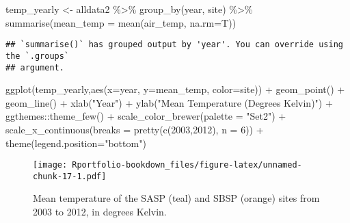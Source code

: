 \documentclass[
]{book}
\newenvironment{Shaded}{\begin{snugshade}}{\end{snugshade}}
\newcommand{\AttributeTok}[1]{\textcolor[rgb]{0.77,0.63,0.00}{#1}}
\newcommand{\DecValTok}[1]{\textcolor[rgb]{0.00,0.00,0.81}{#1}}
\newcommand{\FunctionTok}[1]{\textcolor[rgb]{0.00,0.00,0.00}{#1}}
\newcommand{\NormalTok}[1]{#1}
\newcommand{\OtherTok}[1]{\textcolor[rgb]{0.56,0.35,0.01}{#1}}
\newcommand{\SpecialCharTok}[1]{\textcolor[rgb]{0.00,0.00,0.00}{#1}}
\newcommand{\StringTok}[1]{\textcolor[rgb]{0.31,0.60,0.02}{#1}}
\begin{document}
\begin{Shaded}
\begin{Highlighting}[]
\NormalTok{temp\_yearly }\OtherTok{\textless{}{-}}\NormalTok{ alldata2 }\SpecialCharTok{\%\textgreater{}\%} 
\FunctionTok{group\_by}\NormalTok{(year, site) }\SpecialCharTok{\%\textgreater{}\%}
\FunctionTok{summarise}\NormalTok{(}\AttributeTok{mean\_temp =} \FunctionTok{mean}\NormalTok{(}\StringTok{\textasciigrave{}}\AttributeTok{air\_temp}\StringTok{\textasciigrave{}}\NormalTok{, }\AttributeTok{na.rm=}\NormalTok{T))}
\end{Highlighting}
\end{Shaded}

\begin{verbatim}
## `summarise()` has grouped output by 'year'. You can override using the `.groups`
## argument.
\end{verbatim}

\begin{Shaded}
\begin{Highlighting}[]
\FunctionTok{ggplot}\NormalTok{(temp\_yearly,}\FunctionTok{aes}\NormalTok{(}\AttributeTok{x=}\NormalTok{year, }\AttributeTok{y=}\NormalTok{mean\_temp, }\AttributeTok{color=}\NormalTok{site)) }\SpecialCharTok{+} 
  \FunctionTok{geom\_point}\NormalTok{() }\SpecialCharTok{+} \FunctionTok{geom\_line}\NormalTok{() }\SpecialCharTok{+}
  \FunctionTok{xlab}\NormalTok{(}\StringTok{"Year"}\NormalTok{) }\SpecialCharTok{+} \FunctionTok{ylab}\NormalTok{(}\StringTok{"Mean Temperature (Degrees Kelvin)"}\NormalTok{) }\SpecialCharTok{+}
\NormalTok{  ggthemes}\SpecialCharTok{::}\FunctionTok{theme\_few}\NormalTok{() }\SpecialCharTok{+} 
  \FunctionTok{scale\_color\_brewer}\NormalTok{(}\AttributeTok{palette =} \StringTok{"Set2"}\NormalTok{) }\SpecialCharTok{+} 
  \FunctionTok{scale\_x\_continuous}\NormalTok{(}\AttributeTok{breaks =} \FunctionTok{pretty}\NormalTok{(}\FunctionTok{c}\NormalTok{(}\DecValTok{2003}\NormalTok{,}\DecValTok{2012}\NormalTok{), }\AttributeTok{n =} \DecValTok{6}\NormalTok{)) }\SpecialCharTok{+}
  \FunctionTok{theme}\NormalTok{(}\AttributeTok{legend.position=}\StringTok{"bottom"}\NormalTok{)}
\end{Highlighting}
\end{Shaded}

\begin{figure}
\centering
\texttt{[image: Rportfolio-bookdown\_files/figure-latex/unnamed-chunk-17-1.pdf]}
\caption{\label{fig:unnamed-chunk-17}Mean temperature of the SASP (teal) and SBSP (orange) sites from 2003 to 2012, in degrees Kelvin.}
\end{figure}
\end{document}
